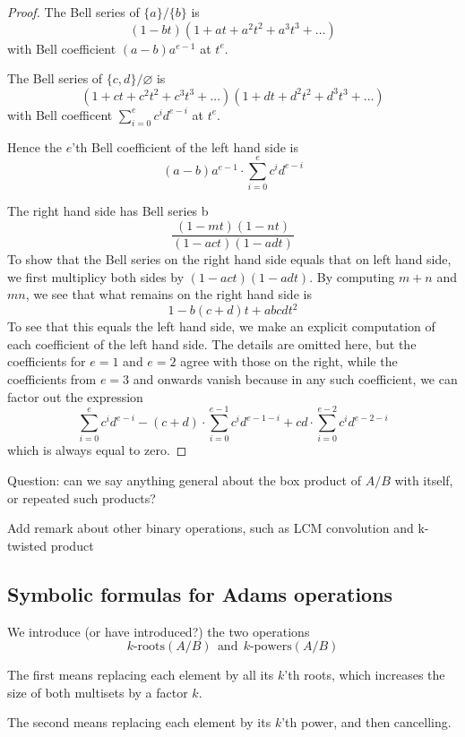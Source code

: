\documentclass[a4paper]{article}
\theoremstyle{definition}
\theoremstyle{remark}
\newcommand{\roots}[1]{{#1}\text{-roots}}
\newcommand{\powers}[1]{{#1}\text{-powers}}
\begin{document}
\begin{proof}
The Bell series of $\{  a \} / \{ b \}$ is 
$$(1-bt) (1+at+a^2 t^2 + a^3 t^3 + \ldots)$$
with Bell coefficient $(a-b) a^{e-1}$ at $t^e$. 

The Bell series of $\{  c,d \} / \varnothing$ is 
$$   (1+ct+c^2 t^2 + c^3 t^3 + \ldots) (1+dt+d^2 t^2 + d^3 t^3 + \ldots)  $$
with Bell coefficent $\sum_{i=0}^e c^i d^{e-i}$ at $t^e$.

Hence the $e$'th Bell coefficient of the left hand side is
$$   (a-b) a^{e-1} \cdot \sum_{i=0}^e c^i d^{e-i}  $$

The right hand side has Bell series
b$$  \frac{(1-mt)(1-nt)}{(1-act) ( 1-adt)}  $$
To show that the Bell series on the right hand side equals that on left hand side, we first multiplicy both sides by $(1-act) ( 1-adt)$. By computing $m+n$ and $mn$, we see that what remains on the right hand side is 
$$  1 - b(c+d) t + abcd t^2 $$
To see that this equals the left hand side, we make an explicit computation of each coefficient of the left hand side. The details are omitted here, but the coefficients for $e=1$ and $e=2$ agree with those on the right, while the coefficients from $e=3$ and onwards vanish because in any such coefficient, we can factor out the expression
$$   \sum_{i=0}^e c^i d^{e-i} - (c+d) \cdot \sum_{i=0}^{e-1} c^i d^{e-1-i} + cd \cdot \sum_{i=0}^{e-2} c^i d^{e-2-i}  $$
which is always equal to zero.
\end{proof}



Question: can we say anything general about the box product of $A/B$ with itself, or repeated such products?

Add remark about other binary operations, such as LCM convolution and k-twisted product



\subsection{Symbolic formulas for Adams operations}

We introduce (or have introduced?) the two operations
$$ \roots{k}(A/B)   \ \ \text{and} \ \ \powers{k}(A/B)$$

The first means replacing each element by all its $k$'th roots, which increases the size of both multisets by a factor $k$.

The second means replacing each element by its $k$'th power, and then cancelling.
\end{document}
